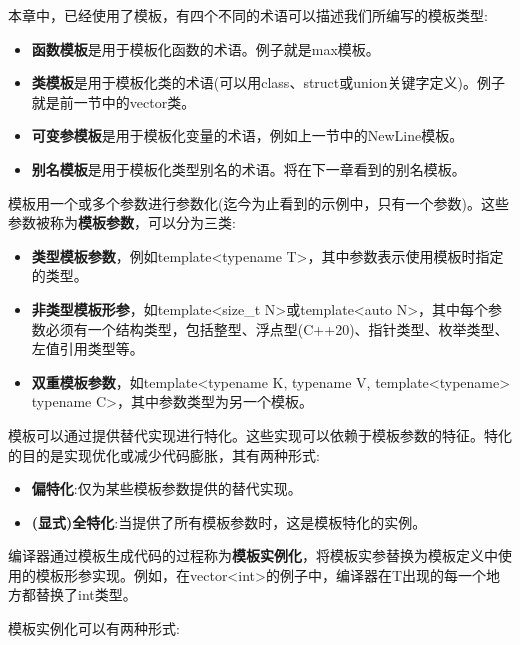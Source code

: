 本章中，已经使用了模板，有四个不同的术语可以描述我们所编写的模板类型:

\begin{itemize}
\item
\textbf{函数模板}是用于模板化函数的术语。例子就是max模板。

\item
\textbf{类模板}是用于模板化类的术语(可以用class、struct或union关键字定义)。例子就是前一节中的vector类。

\item
\textbf{可变参模板}是用于模板化变量的术语，例如上一节中的NewLine模板。

\item
\textbf{别名模板}是用于模板化类型别名的术语。将在下一章看到的别名模板。
\end{itemize}

模板用一个或多个参数进行参数化(迄今为止看到的示例中，只有一个参数)。这些参数被称为\textbf{模板参数}，可以分为三类:

\begin{itemize}
\item
\textbf{类型模板参数}，例如template<typename T>，其中参数表示使用模板时指定的类型。

\item
\textbf{非类型模板形参}，如template<size\_t N>或template<auto N>，其中每个参数必须有一个结构类型，包括整型、浮点型(C++20)、指针类型、枚举类型、左值引用类型等。

\item
\textbf{双重模板参数}，如template<typename K, typename V, template<typename> typename C>，其中参数类型为另一个模板。
\end{itemize}

模板可以通过提供替代实现进行特化。这些实现可以依赖于模板参数的特征。特化的目的是实现优化或减少代码膨胀，其有两种形式:

\begin{itemize}
\item
\textbf{偏特化}:仅为某些模板参数提供的替代实现。

\item
\textbf{(显式)全特化}:当提供了所有模板参数时，这是模板特化的实例。
\end{itemize}

编译器通过模板生成代码的过程称为\textbf{模板实例化}，将模板实参替换为模板定义中使用的模板形参实现。例如，在vector<int>的例子中，编译器在T出现的每一个地方都替换了int类型。

模板实例化可以有两种形式:

